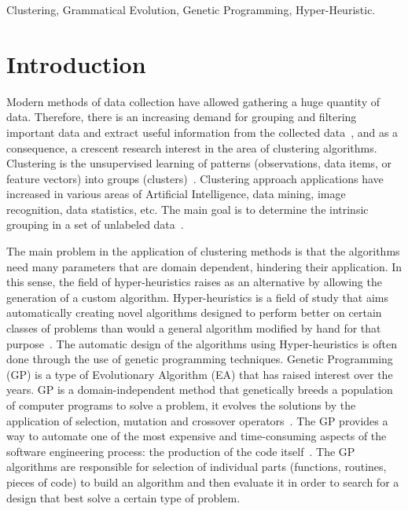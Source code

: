 \documentclass[journal]{IEEEtran}
\begin{document}
	\begin{IEEEkeywords}
		Clustering, Grammatical Evolution, Genetic Programming, Hyper-Heuristic.
	\end{IEEEkeywords}
	
	\IEEEpeerreviewmaketitle
	
	
	\section{Introduction}
	
	Modern methods of data collection have allowed gathering a huge quantity of data. Therefore, there is an increasing demand for grouping and filtering important data and extract useful information from the collected data~\cite{ahalya2015data}, and as a consequence, a crescent research interest in the area of clustering algorithms. Clustering is the unsupervised learning of patterns (observations, data items, or feature vectors) into groups (clusters)~\cite{jain1988algorithms}. Clustering approach applications have increased in various areas of Artificial Intelligence, data mining, image recognition, data statistics, etc. The main goal is to determine the intrinsic grouping in a set of unlabeled data~\cite{ahalya2015data}.
	
	The main problem in the application of clustering methods is that the algorithms need many parameters that are domain dependent, hindering their application. In this sense, the field of hyper-heuristics raises as an alternative by allowing the generation of a custom algorithm. Hyper-heuristics is a field of study that aims automatically creating novel algorithms designed to perform better on certain classes of problems than would a general algorithm modified by hand for that purpose~\cite{harris2015comparison}. The automatic design of the algorithms using Hyper-heuristics is  often done through the use of genetic programming techniques. Genetic Programming (GP) is a type of Evolutionary Algorithm (EA) that has raised interest over the years. GP is a domain-independent method that genetically breeds a population of computer programs to solve a problem, it evolves the solutions by the application of selection, mutation and crossover operators~\cite{poli2014genetic}. The GP provides a way to automate one of the most expensive and time-consuming aspects of the software engineering process: the production of the code itself~\cite{langdon2013optimising}. The GP algorithms are responsible for selection of individual parts (functions, routines, pieces of code) to build an algorithm and then evaluate it in order to search for a design that best solve a certain type of problem.
	
\end{document}
